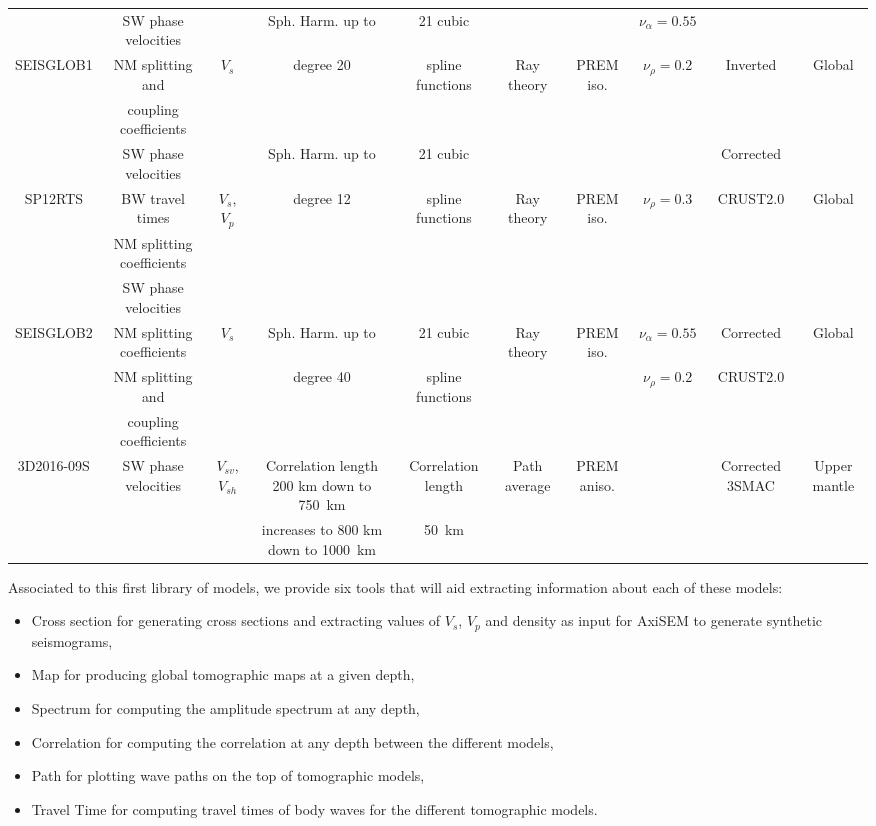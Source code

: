 \documentclass[12pt]{article}
\begin{document}
\begin{table}
{\begin{tabular}{|c|c|c|c|c|c|c|c|c|c|}
\hline
 & SW phase velocities  && Sph. Harm. up to & 21 cubic  &  & &  $\nu_\alpha = 0.55$& &\\
  SEISGLOB1& NM splitting and &$V_s$&   degree 20  & spline functions & Ray theory &  PREM iso. &$\nu_\rho = 0.2$ & Inverted& Global\\
 \tiny \citep{durand16}&  coupling coefficients && & &  &  &&& \\
\hline
 & SW phase velocities  && Sph. Harm. up to & 21 cubic  &  & & &Corrected&\\
SP12RTS & BW travel times &$V_s$, $V_p$&   degree 12  & spline functions & Ray theory &   PREM iso. & $\nu_\rho = 0.3$&CRUST2.0&  Global\\
  \tiny \citep{koelemeijer16}&  NM splitting coefficients &&  & &  &  & &&\\
\hline
 & SW phase velocities  && &  &&  && &\\
  SEISGLOB2& NM splitting coefficients &$V_s$&   Sph. Harm. up to   &  21 cubic & Ray theory   & PREM iso. & $\nu_\alpha = 0.55$ & Corrected& Global\\
\tiny \citep{durand17} &  NM splitting and &&degree 40   & spline functions  &  &  &$\nu_\rho = 0.2$ & CRUST2.0&\\
  &  coupling coefficients && & &  &  &&& \\
\hline
  3D2016-09S& SW phase velocities &$V_{sv}$, $V_{sh}$&   Correlation length 200 km down to 750~km  &  Correlation length & Path average   & PREM aniso. &  & Corrected 3SMAC & Upper mantle\\
\tiny \citep{debayle16} &  && increases to 800 km down to 1000~km  &  50~km &  &  & & \tiny \citep{nataf93}&\\
\hline
\end{tabular}}
\end{table}

Associated to this first library of models, we provide six tools that will aid  extracting  information about each of these models:
\begin{itemize}
\item Cross section for generating cross sections and extracting values of $V_s$, $V_p$ and density as input for AxiSEM to generate synthetic seismograms,
\item Map for producing global tomographic maps at a given depth,
\item Spectrum for computing the amplitude spectrum at any depth,
\item Correlation for computing the correlation at any depth between the different models,
\item Path for plotting wave paths on the top of tomographic models,
\item Travel Time for computing travel times of body waves for the different tomographic models.
\end{itemize}
\end{document}
